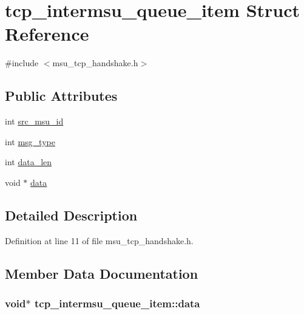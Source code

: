 \hypertarget{structtcp__intermsu__queue__item}{\section{tcp\-\_\-intermsu\-\_\-queue\-\_\-item Struct Reference}
\label{structtcp__intermsu__queue__item}
}


{\ttfamily \#include $<$msu\-\_\-tcp\-\_\-handshake.\-h$>$}

\subsection*{Public Attributes}
\begin{DoxyCompactItemize}
\item 
int \hyperlink{structtcp__intermsu__queue__item_a6e4f60b7b4ccfa293441bcd271bd0ae2}{src\-\_\-msu\-\_\-id}
\item 
int \hyperlink{structtcp__intermsu__queue__item_a7a009ad7a7ac74685a3ce5f68cebb875}{msg\-\_\-type}
\item 
int \hyperlink{structtcp__intermsu__queue__item_a7c72efb4c359f8be69b154a58b0c6024}{data\-\_\-len}
\item 
void $\ast$ \hyperlink{structtcp__intermsu__queue__item_a2d1add76170001c416d33cffa604f8e2}{data}
\end{DoxyCompactItemize}


\subsection{Detailed Description}


Definition at line 11 of file msu\-\_\-tcp\-\_\-handshake.\-h.



\subsection{Member Data Documentation}
\hypertarget{structtcp__intermsu__queue__item_a2d1add76170001c416d33cffa604f8e2}{
\subsubsection[{data}]{\setlength{\rightskip}{0pt plus 5cm}void$\ast$ tcp\-\_\-intermsu\-\_\-queue\-\_\-item\-::data}}\label{structtcp__intermsu__queue__item_a2d1add76170001c416d33cffa604f8e2}



